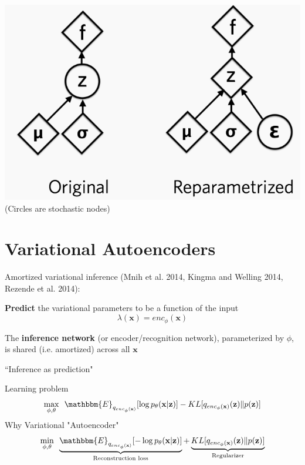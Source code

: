 \documentclass{beamer}
\let\tempone\itemize
\let\temptwo\enditemize
\renewenvironment{itemize}{\tempone\addtolength{\itemsep}{0.5\baselineskip}}{\temptwo}
\newcommand{\zvec}{\mathbf{z}}
\newcommand{\E}{\mathbbm{E}}
\newcommand{\xvec}{\mathbf{x}}
\begin{document}
\begin{frame}
  \begin{center}
   \end{center}
   \center
\includegraphics[scale=0.35]{reparam} \\
(Circles are stochastic nodes)
\end{frame}

\section{Variational Autoencoders}
\begin{frame}
  \begin{center}
   \end{center}
Amortized variational inference (Mnih et al. 2014, Kingma and Welling 2014, Rezende et al. 2014):
\begin{itemize}
\item  \textbf{Predict} the variational parameters to be a function of the input
\[ \lambda(\xvec) = enc_\phi (\xvec) \]
\item The \textbf{inference network} (or encoder/recognition network), parameterized by $\phi$, is shared (i.e. amortized) across all $\xvec$
\item ``Inference as prediction"
\end{itemize}
\end{frame}

\begin{frame}
  \begin{center}
   \end{center}
Learning problem
\[ \max_{\phi, \theta} \,\,\, \E_{q_{enc_\phi(\xvec)}}[\log p_\theta (\xvec | \zvec)] - KL[q_{enc_\phi(\xvec)}(\zvec) \Vert p(\zvec)]\]
Why Variational "Autoencoder"
\[ \min_{\phi, \theta}  \,\,\, \underbrace{\E_{q_{enc_\phi(\xvec)}}[-\log p_\theta (\xvec | \zvec)]}_{\text{Reconstruction loss}} + \underbrace{KL[q_{enc_\phi(\xvec)}(\zvec) \Vert p(\zvec)]}_{\text{Regularizer}}\]
\end{frame}
\end{document}
